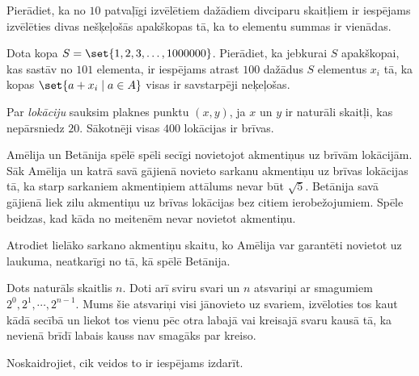 



\renewcommand{\theenumi}{\alph{enumi}}



 


\begin{problem}

Pierādiet, ka no $10$ patvaļīgi izvēlētiem dažādiem divciparu skaitļiem ir iespējams izvēlēties divas nešķeļošās apakškopas tā, ka to elementu summas ir vienādas.

\end{problem}

\begin{problem}

Dota kopa $S = \set{1, 2, 3, \dots ,1000000}$. Pierādiet, ka jebkurai $S$ apakškopai, kas sastāv no $101$ elementa, ir iespējams atrast $100$ dažādus $S$ elementus $x_i$ tā, ka kopas $\set{a + x_i \mid a \in A}$ visas ir savstarpēji neķeļošas.


\end{problem}


\begin{problem}

Par \emph{lokāciju} sauksim plaknes punktu $(x, y)$, ja $x$ un $y$ ir naturāli skaitļi, kas nepārsniedz $20$. 
Sākotnēji visas $400$ lokācijas ir brīvas.

Amēlija un Betānija spēlē spēli secīgi novietojot akmentiņus uz brīvām lokācijām. Sāk Amēlija un katrā savā gājienā novieto sarkanu akmentiņu uz brīvas lokācijas tā, ka starp sarkaniem akmentiņiem attālums nevar būt $\sqrt{5}$.
Betānija savā gājienā liek zilu akmentiņu uz brīvas lokācijas bez citiem ierobežojumiem.
Spēle beidzas, kad kāda no meitenēm nevar novietot akmentiņu. 

Atrodiet lielāko sarkano akmentiņu skaitu, ko Amēlija var garantēti novietot uz laukuma, neatkarīgi no tā, kā spēlē Betānija.


\end{problem}

\begin{problem}
Dots naturāls skaitlis $n$. 
Doti arī sviru svari un $n$ atsvariņi ar smagumiem $2^0,2^1, \cdots ,2^{n-1}$.
Mums šie atsvariņi visi jānovieto uz svariem, izvēloties tos kaut kādā secībā un liekot tos vienu pēc otra labajā vai kreisajā svaru kausā tā, ka nevienā brīdī labais kauss nav smagāks par kreiso.

Noskaidrojiet, cik veidos to ir iespējams izdarīt.
\end{problem}


